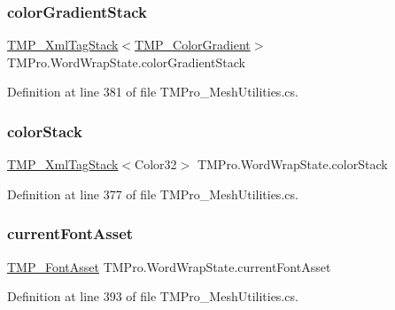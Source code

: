 \subsubsection{\texorpdfstring{colorGradientStack}{colorGradientStack}}
{\footnotesize\ttfamily \mbox{\hyperlink{struct_t_m_pro_1_1_t_m_p___xml_tag_stack}{T\+M\+P\+\_\+\+Xml\+Tag\+Stack}}$<$\mbox{\hyperlink{class_t_m_pro_1_1_t_m_p___color_gradient}{T\+M\+P\+\_\+\+Color\+Gradient}}$>$ T\+M\+Pro.\+Word\+Wrap\+State.\+color\+Gradient\+Stack}



Definition at line 381 of file T\+M\+Pro\+\_\+\+Mesh\+Utilities.\+cs.

\mbox{\label{struct_t_m_pro_1_1_word_wrap_state_a4931cb815a6cbc174ada646020c60a3c}} 
\subsubsection{\texorpdfstring{colorStack}{colorStack}}
{\footnotesize\ttfamily \mbox{\hyperlink{struct_t_m_pro_1_1_t_m_p___xml_tag_stack}{T\+M\+P\+\_\+\+Xml\+Tag\+Stack}}$<$Color32$>$ T\+M\+Pro.\+Word\+Wrap\+State.\+color\+Stack}



Definition at line 377 of file T\+M\+Pro\+\_\+\+Mesh\+Utilities.\+cs.

\mbox{\label{struct_t_m_pro_1_1_word_wrap_state_ac4e0f73280095c102ed208e1341231ae}} 
\subsubsection{\texorpdfstring{currentFontAsset}{currentFontAsset}}
{\footnotesize\ttfamily \mbox{\hyperlink{class_t_m_pro_1_1_t_m_p___font_asset}{T\+M\+P\+\_\+\+Font\+Asset}} T\+M\+Pro.\+Word\+Wrap\+State.\+current\+Font\+Asset}



Definition at line 393 of file T\+M\+Pro\+\_\+\+Mesh\+Utilities.\+cs.

\mbox{\label{struct_t_m_pro_1_1_word_wrap_state_a17078a869763dcc95df4367b55fe74f5}} 
